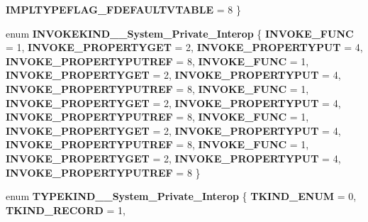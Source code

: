 \begin{DoxyCompactItemize}
{\bfseries I\+M\+P\+L\+T\+Y\+P\+E\+F\+L\+A\+G\+\_\+\+F\+D\+E\+F\+A\+U\+L\+T\+V\+T\+A\+B\+LE} = 8
 \}
\item 
\mbox{\label{namespace_system_1_1_runtime_1_1_interop_services_1_1_com_types_ab7f514e292cc5056c72acfec28a67bd4}} 
enum {\bfseries I\+N\+V\+O\+K\+E\+K\+I\+N\+D\+\_\+\+\_\+\+System\+\_\+\+Private\+\_\+\+Interop} \{ \newline
{\bfseries I\+N\+V\+O\+K\+E\+\_\+\+F\+U\+NC} = 1, 
{\bfseries I\+N\+V\+O\+K\+E\+\_\+\+P\+R\+O\+P\+E\+R\+T\+Y\+G\+ET} = 2, 
{\bfseries I\+N\+V\+O\+K\+E\+\_\+\+P\+R\+O\+P\+E\+R\+T\+Y\+P\+UT} = 4, 
{\bfseries I\+N\+V\+O\+K\+E\+\_\+\+P\+R\+O\+P\+E\+R\+T\+Y\+P\+U\+T\+R\+EF} = 8, 
\newline
{\bfseries I\+N\+V\+O\+K\+E\+\_\+\+F\+U\+NC} = 1, 
{\bfseries I\+N\+V\+O\+K\+E\+\_\+\+P\+R\+O\+P\+E\+R\+T\+Y\+G\+ET} = 2, 
{\bfseries I\+N\+V\+O\+K\+E\+\_\+\+P\+R\+O\+P\+E\+R\+T\+Y\+P\+UT} = 4, 
{\bfseries I\+N\+V\+O\+K\+E\+\_\+\+P\+R\+O\+P\+E\+R\+T\+Y\+P\+U\+T\+R\+EF} = 8, 
\newline
{\bfseries I\+N\+V\+O\+K\+E\+\_\+\+F\+U\+NC} = 1, 
{\bfseries I\+N\+V\+O\+K\+E\+\_\+\+P\+R\+O\+P\+E\+R\+T\+Y\+G\+ET} = 2, 
{\bfseries I\+N\+V\+O\+K\+E\+\_\+\+P\+R\+O\+P\+E\+R\+T\+Y\+P\+UT} = 4, 
{\bfseries I\+N\+V\+O\+K\+E\+\_\+\+P\+R\+O\+P\+E\+R\+T\+Y\+P\+U\+T\+R\+EF} = 8, 
\newline
{\bfseries I\+N\+V\+O\+K\+E\+\_\+\+F\+U\+NC} = 1, 
{\bfseries I\+N\+V\+O\+K\+E\+\_\+\+P\+R\+O\+P\+E\+R\+T\+Y\+G\+ET} = 2, 
{\bfseries I\+N\+V\+O\+K\+E\+\_\+\+P\+R\+O\+P\+E\+R\+T\+Y\+P\+UT} = 4, 
{\bfseries I\+N\+V\+O\+K\+E\+\_\+\+P\+R\+O\+P\+E\+R\+T\+Y\+P\+U\+T\+R\+EF} = 8, 
\newline
{\bfseries I\+N\+V\+O\+K\+E\+\_\+\+F\+U\+NC} = 1, 
{\bfseries I\+N\+V\+O\+K\+E\+\_\+\+P\+R\+O\+P\+E\+R\+T\+Y\+G\+ET} = 2, 
{\bfseries I\+N\+V\+O\+K\+E\+\_\+\+P\+R\+O\+P\+E\+R\+T\+Y\+P\+UT} = 4, 
{\bfseries I\+N\+V\+O\+K\+E\+\_\+\+P\+R\+O\+P\+E\+R\+T\+Y\+P\+U\+T\+R\+EF} = 8
 \}
\item 
\mbox{\label{namespace_system_1_1_runtime_1_1_interop_services_1_1_com_types_ad596501be9a8be229bde10d7bf051f8f}} 
enum {\bfseries T\+Y\+P\+E\+K\+I\+N\+D\+\_\+\+\_\+\+System\+\_\+\+Private\+\_\+\+Interop} \{ \newline
{\bfseries T\+K\+I\+N\+D\+\_\+\+E\+N\+UM} = 0, 
{\bfseries T\+K\+I\+N\+D\+\_\+\+R\+E\+C\+O\+RD} = 1, 

\end{DoxyCompactItemize}
